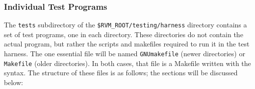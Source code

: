 \subsubsection{Individual Test Programs}

 The {\tt tests} subdirectory of the {\tt{\$RVM\_\-ROOT/testing/harness}}
directory contains a set of test programs, one in each directory.
These directories do not contain the actual program, but rather the
scripts and makefiles required to run it in the test harness.  The one
essential file will be named \texttt{GNUmakefile} (newer directories)
or \texttt{Makefile} (older directories).  In both cases, that file is
a Makefile written with the  syntax.  The structure of these
files is as follows; the sections will be discussed below:  
\begin{enumerate}
\end{enumerate}

